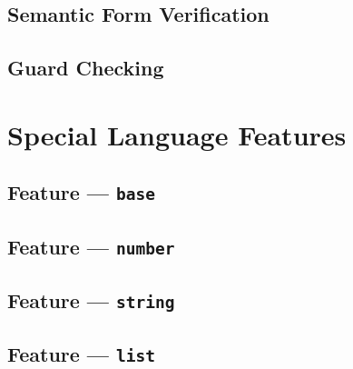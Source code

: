 
\subsection{Semantic Form Verification} %
\label{sub:semantic_form_verification}


\subsection{Guard Checking} %
\label{sub:guard_checking}



\section{Special Language Features} %
\label{sec:special_language_features}

\subsection{Feature --- \texttt{base}} %
\label{sub:feature_base}


\subsection{Feature --- \texttt{number}} %
\label{sub:feature_number}


\subsection{Feature --- \texttt{string}} %
\label{sub:feature_string}


\subsection{Feature --- \texttt{list}} %
\label{sub:feature_list}

